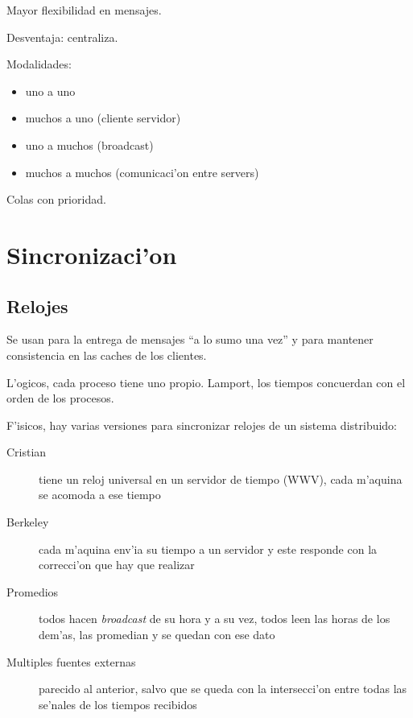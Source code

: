 \documentclass[a4paper,spanish]{article}
\begin{document}
Mayor flexibilidad en mensajes.

Desventaja: centraliza.

Modalidades:
\begin{itemize}
	\item uno a uno
	\item muchos a uno (cliente servidor)
	\item uno a muchos (broadcast)
	\item muchos a muchos (comunicaci'on entre servers)
\end{itemize}
Colas con prioridad.



\section{Sincronizaci'on}

\subsection{Relojes}
Se usan para la entrega de mensajes ``a lo sumo una vez'' y para mantener
consistencia en las caches de los clientes.

L'ogicos, cada proceso tiene uno propio. Lamport, los tiempos concuerdan con el
orden de los procesos.

F'isicos, hay varias versiones para sincronizar relojes de un sistema
distribuido:
\begin{description}
	\item[Cristian] tiene un reloj universal en un servidor de tiempo
(WWV), cada m'aquina se acomoda a ese tiempo
	\item[Berkeley] cada m'aquina env'ia su tiempo a un servidor y este
responde con la correcci'on que hay que realizar
	\item[Promedios] todos hacen \emph{broadcast} de su hora y a su vez,
todos leen las horas de los dem'as, las promedian y se quedan con ese dato
	\item[Multiples fuentes externas] parecido al anterior, salvo que se
queda con la intersecci'on entre todas las se'nales de los tiempos recibidos
\end{description}
\end{document}
